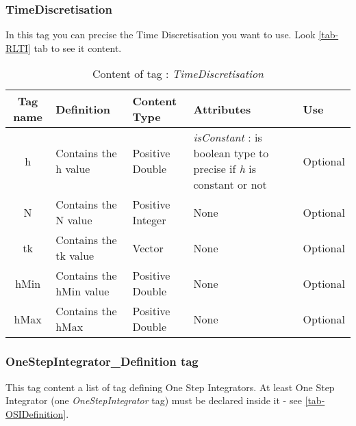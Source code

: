 \subsubsection{TimeDiscretisation}
\label{TDTag}
In this tag you can precise the Time Discretisation you want to use.
Look \ref{tab-RLTI} tab to see it content.


\begin{table}[!hbp]
\begin{center}
\begin{tabular}{|c|p{6cm}|p{2cm}|p{3cm}|p{2cm}|}
\hline
\bf{Tag name} & \bf{Definition} & \bf{Content Type} & \bf{Attributes} & \bf{Use}
\\\hline
\hline
h	          & Contains the h value & Positive Double & \textit{isConstant} : is boolean type to precise if \textit{h} is constant or not  &  Optional \\
\hline
N	          & Contains the N value & Positive Integer & None &  Optional \\
\hline
tk	          & Contains the tk value & Vector & None &  Optional \\
\hline
hMin	          & Contains the hMin value & Positive Double & None &  Optional \\
\hline
hMax	          & Contains the hMax & Positive Double & None &  Optional \\
\hline
\end{tabular}
\end{center}
\caption{Content of tag : \textit{TimeDiscretisation}}
\label{tab-TD}
\end{table}



\subsubsection{OneStepIntegrator\_Definition tag}
\label{OSIDefTag}

This tag content a list of tag defining One Step Integrators. At least One Step Integrator (one \textit{OneStepIntegrator} tag) must be declared inside it - see \ref{tab-OSIDefinition}.\\

